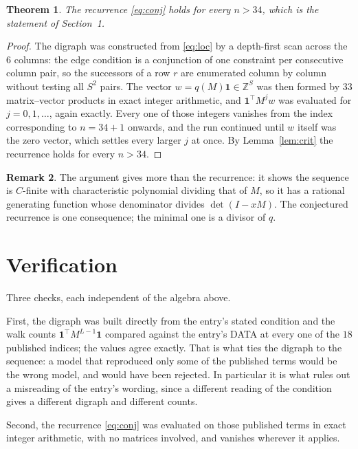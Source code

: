 \documentclass[11pt,a4paper]{article}
\theoremstyle{plain}
\newtheorem{theorem}{Theorem}
\theoremstyle{definition}
\newtheorem{remark}[theorem]{Remark}
\begin{document}
\begin{theorem}
The recurrence \eqref{eq:conj} holds for every $n>34$, which is the statement of
Section~1.
\end{theorem}

\begin{proof}
The digraph was constructed from \eqref{eq:loc} by a depth-first scan across the $6$
columns: the edge condition is a conjunction of one constraint per consecutive column
pair, so the successors of a row $r$ are enumerated column by column without testing all
$S^2$ pairs. The vector $w=q(M)\mathbf{1}\in\mathbb{Z}^{S}$ was then formed by $33$
matrix--vector products in exact integer arithmetic, and $\mathbf{1}^{\!\top}M^{j}w$ was
evaluated for $j=0,1,\dots$, again exactly. Every one of those integers vanishes from the
index corresponding to $n=34+1$ onwards, and the run continued until $w$ itself was the
zero vector, which settles every larger $j$ at once. By Lemma~\ref{lem:crit} the recurrence
holds for every $n>34$.
\end{proof}

\begin{remark}
The argument gives more than the recurrence: it shows the sequence is $C$-finite with
characteristic polynomial dividing that of $M$, so it has a rational generating function
whose denominator divides $\det(I-xM)$. The conjectured recurrence is one consequence; the
minimal one is a divisor of $q$.
\end{remark}

\section{Verification}

Three checks, each independent of the algebra above.

First, the digraph was built directly from the entry's stated condition and the walk counts
$\mathbf{1}^{\!\top}M^{L-1}\mathbf{1}$ compared against the entry's DATA at
every one of the $18$ published indices; the values agree exactly. That is what ties
the digraph to the sequence: a model that reproduced only some of the published terms would
be the wrong model, and would have been rejected. In particular it is what rules out a
misreading of the entry's wording, since a different reading of the condition gives a
different digraph and different counts.

Second, the recurrence \eqref{eq:conj} was evaluated on those published terms in exact
integer arithmetic, with no matrices involved, and vanishes wherever it applies.
\end{document}
